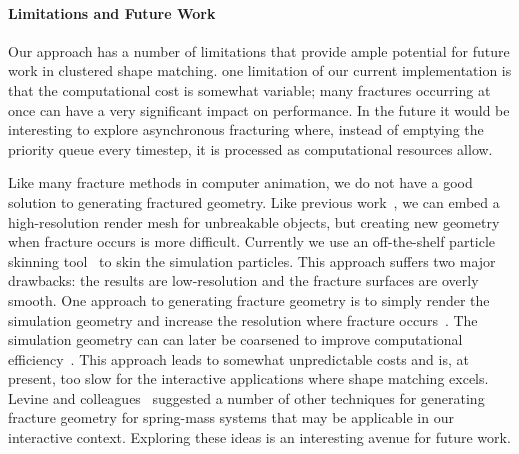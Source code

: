 \documentclass[conference]{acmsiggraph}
\begin{document}
\paragraph{Limitations and Future Work}
Our approach has a number of limitations that provide ample potential for future work in clustered shape matching.
one limitation of our current implementation is that the computational cost is somewhat variable; 
many fractures occurring at once
can have a very significant impact on performance.  In the future it would be interesting to explore asynchronous fracturing
where, instead of emptying the priority queue every timestep, it is processed as computational resources allow.


Like many fracture methods in computer animation, we do not have a good solution to generating fractured
geometry.  Like previous  work~\cite{Mueller:2005:MDB,Rivers:2007:FFL}, we can embed a high-resolution 
render mesh for unbreakable objects, but creating new geometry when fracture occurs is more difficult.  
Currently we use an off-the-shelf particle skinning tool~\cite{Bhattacharya:2015:ALM} to skin the simulation particles.
This approach suffers two major drawbacks: the results are low-resolution and the fracture surfaces are overly smooth.  
One approach to generating fracture geometry is to simply render the simulation geometry and increase the resolution 
where fracture occurs~\cite{Obrien:1999:GMA,Obrien:2002:GMA}.  The simulation geometry can can later be 
coarsened to improve computational efficiency~\cite{Pfaff:2014:ATC}.  This approach leads to
somewhat unpredictable costs and is, at present, too slow for the interactive applications where shape matching excels.
Levine and colleagues~ suggested a number of other techniques for generating fracture geometry
for spring-mass systems that may be applicable in our interactive context.  Exploring these ideas is an interesting avenue 
for future work.
\end{document}
